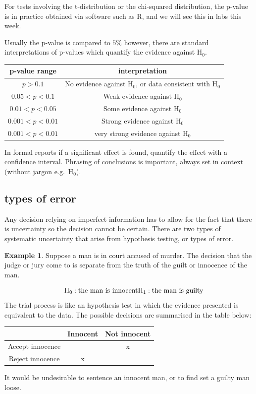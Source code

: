 \documentclass[
]{book}
\theoremstyle{definition}
\theoremstyle{definition}
\newtheorem{example}{Example}[chapter]
\theoremstyle{definition}
\theoremstyle{definition}
\theoremstyle{remark}
\begin{document}
For tests involving the t-distribution or the chi-squared distribution, the p-value is in practice obtained via software such as R, and we will see this in labs this week.

Usually the p-value is compared to \(5\%\) however, there are standard interpretations of p-values which quantify the evidence against \(\text{H}_0\).

\begin{longtable}[]{@{}cc@{}}
\toprule
p-value range & interpretation\tabularnewline
\midrule
\endhead
\(p>0.1\) & No evidence against H\(_0\), or data consistent with H\(_0\)\tabularnewline
\(0.05 < p < 0.1\) & Weak evidence against H\(_0\)\tabularnewline
\(0.01 < p < 0.05\) & Some evidence against H\(_0\)\tabularnewline
\(0.001 < p < 0.01\) & Strong evidence against H\(_0\)\tabularnewline
\(0.001 < p < 0.01\) & very strong evidence against H\(_0\)\tabularnewline
\bottomrule
\end{longtable}

In formal reports if a significant effect is found, quantify the effect with a confidence interval. Phrasing of conclusions is important, always set in context (without jargon e.g.~H\(_0\)).

\hypertarget{types-of-error}{%
\subsection{types of error}\label{types-of-error}}

Any decision relying on imperfect information has to allow for the fact that there is uncertainty so the decision cannot be certain. There are two types of systematic uncertainty that arise from hypothesis testing, or types of error.

\begin{example}
Suppose a man is in court accused of murder. The decision that the judge or jury come to is separate from the truth of the guilt or innocence of the man.

\[\ \ \ \ \text{H}_0: \text{the man is innocent} \\ \text{H}_1: \text{the man is guilty}\]
The trial process is like an hypothesis test in which the evidence presented is equivalent to the data. The possible decisions are summarised in the table below:

\begin{longtable}[]{@{}ccc@{}}
\toprule
& Innocent & Not innocent\tabularnewline
\midrule
\endhead
Accept innocence & & x\tabularnewline
Reject innocence & x &\tabularnewline
\bottomrule
\end{longtable}

It would be undesirable to sentence an innocent man, or to find set a guilty man loose.
\end{example}
\end{document}
